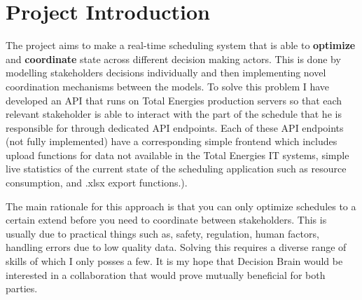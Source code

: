 \newpage
\section{Project Introduction}

The project aims to make a real-time scheduling system that is able to \textbf{optimize} and \textbf{coordinate} state across
different decision making actors. This is done by modelling stakeholders decisions individually and then implementing novel coordination
mechanisms between the models. To solve this problem I have developed an API that runs on Total
Energies production servers so that each relevant stakeholder is able to interact with the part 
of the schedule that he is responsible for through dedicated API endpoints. Each of these API 
endpoints (not fully implemented) have a corresponding simple frontend which includes upload functions for data not available 
in the Total Energies IT systems, simple live statistics of the current state 
of the scheduling application such as resource consumption, and .xlsx export functions.).

The main rationale for this approach is that you can only optimize schedules to a certain extend before you need to coordinate between 
stakeholders. This is usually due to practical things such as, safety, regulation, human factors, handling errors due to low quality data. 
Solving this requires a diverse range of skills of which I only posses a few. It is my hope that Decision Brain
would be interested in a collaboration that would prove mutually beneficial for both parties. 
